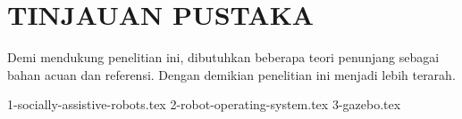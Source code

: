 \chapter{TINJAUAN PUSTAKA}
\label{chap:tinjauanpustaka}

Demi mendukung penelitian ini, dibutuhkan beberapa teori penunjang sebagai bahan acuan dan referensi.
Dengan demikian penelitian ini menjadi lebih terarah.

{1-socially-assistive-robots.tex}
{2-robot-operating-system.tex}
{3-gazebo.tex}
